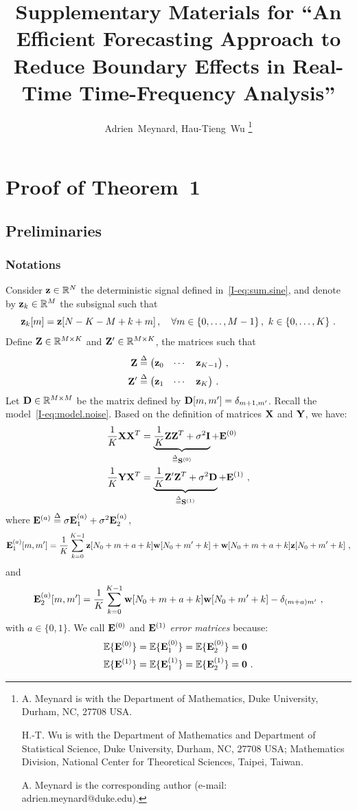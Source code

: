 \documentclass[journal,onecolumn]{IEEEtran}
\title{Supplementary Materials for ``An Efficient Forecasting Approach to Reduce Boundary Effects in Real-Time Time-Frequency Analysis''}
\author{Adrien~Meynard, %
        Hau-Tieng~Wu
\thanks{A. Meynard is with the Department
of Mathematics, Duke University, Durham,
NC, 27708 USA.

H.-T. Wu is with the Department of Mathematics and Department of Statistical Science, Duke University, Durham, NC, 27708 USA; Mathematics Division, National Center for Theoretical Sciences, Taipei, Taiwan.
 
A. Meynard is the corresponding author (e-mail: adrien.meynard@duke.edu).}}
\begin{document}
\maketitle


\section{Proof of Theorem~1}
\label{ap:th.error}

\subsection{Preliminaries}

\subsubsection{Notations}
Consider ${\mathbf z}\in{\mathbb R}^N$ the deterministic signal defined in~\eqref{I-eq:sum.sine}, and denote by ${\mathbf z}_k\in{\mathbb R}^M$ the subsignal such that
\[
{\mathbf z}_k[m] = {\mathbf z}[N-K-M+k+m]\,,\quad \forall m\in\{0,\ldots,M-1\}\,,\ k\in\{0,\ldots,K\}\ .
\]
Define ${\mathbf Z}\in{\mathbb R}^{M \times K}$ and ${\mathbf Z}'\in{\mathbb R}^{M \times K}$, the matrices such that
\begin{align*}
{\mathbf Z} &\overset{\Delta}{=} \begin{pmatrix}
{\mathbf z}_0 & \cdots & {\mathbf z}_{K-1}
\end{pmatrix}\,,\\ 
{\mathbf Z}' &\overset{\Delta}{=} \begin{pmatrix}
{\mathbf z}_1 & \cdots & {\mathbf z}_{K}
\end{pmatrix}\,.
\end{align*}
Let ${\mathbf D}\in{\mathbb R}^{M\times M}$ be the matrix defined by ${\mathbf D}[m,m']=\delta_{m+1,m'}$. Recall the model~\eqref{I-eq:model.noise}. Based on the definition of matrices ${\mathbf X}$ and ${\mathbf Y}$, we have:
\begin{align}
\label{eq:XX.T}
\dfrac1K\bX\bX^T &= \underbrace{\dfrac1K\bZ\bZ^T+\sigma^2\bI}_{\defeq \bS^{(0)}} + \bE^{(0)} \\
\label{eq:YX.T}
\dfrac1K\bY\bX^T &= \underbrace{\dfrac1K\bZ'\bZ^T +\sigma^2\bD}_{\defeq \bS^{(1)}}+ \bE^{(1)} \ ,
\end{align}
where ${\mathbf E}^{(a)} \overset{\Delta}{=} \sigma{\mathbf E}_1^{(a)} + \sigma^2{\mathbf E}_2^{(a)}$,
\[
{\mathbf E}_1^{(a)}[m,m'] = \dfrac1K\sum_{k=0}^{K-1} {\mathbf z}[N_0+m+a+k]{\mathbf w}[N_0+m'+k] + {\mathbf w}[N_0+m+a+k]{\mathbf z}[N_0+m'+k]\ ,
\]
and
\[
{\mathbf E}_2^{(a)}[m,m'] =  \dfrac1K\sum_{k=0}^{K-1} {\mathbf w}[N_0+m+a+k]{\mathbf w}[N_0+m'+k] - \delta_{(m+a)m'}\ ,
\]
with $a\in\{0,1\}$.
We call ${\mathbf E}^{(0)}$ and ${\mathbf E}^{(1)}$ {\em error matrices} because:
\begin{align*}
{\mathbb E}\{{\mathbf E}^{(0)}\} &= {\mathbb E}\{{\mathbf E}_1^{(0)}\} = {\mathbb E}\{{\mathbf E}_2^{(0)}\} = \boldsymbol{0} \\
{\mathbb E}\{{\mathbf E}^{(1)}\} &= {\mathbb E}\{{\mathbf E}_1^{(1)}\} = {\mathbb E}\{{\mathbf E}_2^{(1)}\} = \boldsymbol{0}\ .
\end{align*}
\end{document}
